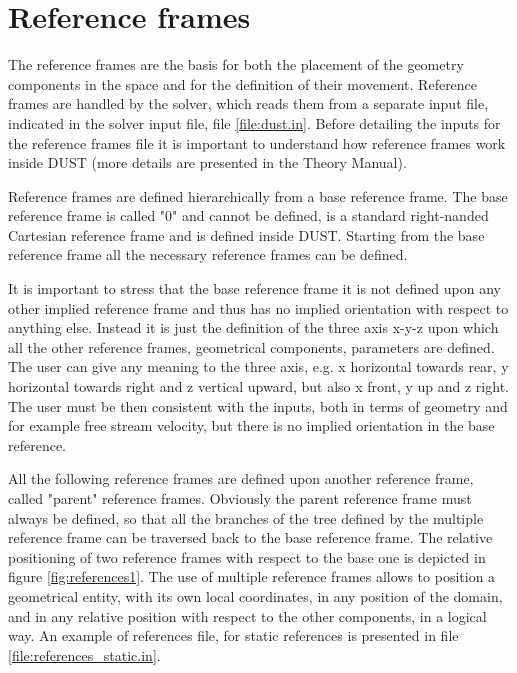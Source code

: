 \section{Reference frames}
\label{sec:Solver_ReferenceFrames}

The reference frames are the basis for both the placement of the geometry components in the space and for the definition of their movement.  Reference frames are handled by the solver, which reads them from a separate input file, indicated in the solver input file, file \ref{file:dust.in}. Before detailing the inputs for the reference frames file it is important to understand how reference frames work inside DUST (more details are presented in the Theory Manual).

Reference frames are defined hierarchically from a base reference frame. The base reference frame is called "0" and cannot be defined, is a standard right-nanded Cartesian reference frame and is defined inside DUST. Starting from the base reference frame all the necessary reference frames can be defined. 

It is important to stress that the base reference frame it is not defined upon any other implied reference frame and thus has no implied orientation with respect to anything else. Instead it is just the definition of the three axis x-y-z upon which all the other reference frames, geometrical components, parameters are defined. The user can give any meaning to the three axis, e.g. x horizontal towards rear, y horizontal towards right and z vertical upward, but also x front, y up and z right. The user must be then consistent with the inputs, both in terms of geometry and for example free stream velocity, but there is no implied orientation in the base reference.

All the following reference frames are defined upon another reference frame, called "parent" reference frames. Obviously the parent reference frame must always be defined, so that all the branches of the tree defined by the multiple reference frame can be traversed back to the base reference frame. The relative positioning of two reference frames with respect to the base one is depicted in figure \ref{fig:references1}. The use of multiple reference frames allows to position a geometrical entity, with its own local coordinates, in any position of the domain, and in any relative position with respect to the other components, in a logical way.  An example of references file, for static references is presented in file \ref{file:references_static.in}. 

